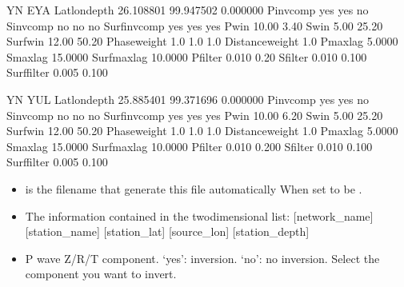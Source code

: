 \documentclass[a4paper,10pt,english,openany]{sphinxmanual}
\begin{document}
\begin{sphinxVerbatim}[commandchars=\\\{\},numbers=left,firstnumber=1,stepnumber=1]
YN   EYA   
Lat\PYGZus{}lon\PYGZus{}depth	26.108801   99.947502   0.000000   
P\PYGZus{}inv\PYGZus{}comp	yes	yes	no	
S\PYGZus{}inv\PYGZus{}comp	no	no	no	
Surf\PYGZus{}inv\PYGZus{}comp	yes	yes	yes	
P\PYGZus{}win		\PYGZhy{}10.00	3.40	
S\PYGZus{}win		\PYGZhy{}5.00	25.20	
Surf\PYGZus{}win		\PYGZhy{}12.00	50.20	
Phase\PYGZus{}weight	1.0	1.0	1.0	
Distance\PYGZus{}weight	1.0	
P\PYGZus{}maxlag		5.0000	
S\PYGZus{}maxlag		15.0000	
Surf\PYGZus{}maxlag	10.0000	
P\PYGZus{}filter		0.010	0.20	
S\PYGZus{}filter		0.010	0.100	
Surf\PYGZus{}filter	0.005	0.100	

YN   YUL   
Lat\PYGZus{}lon\PYGZus{}depth	25.885401   99.371696   0.000000   
P\PYGZus{}inv\PYGZus{}comp	yes	yes	no	
S\PYGZus{}inv\PYGZus{}comp	no	no	no	
Surf\PYGZus{}inv\PYGZus{}comp	yes	yes	yes	
P\PYGZus{}win		\PYGZhy{}10.00	6.20	
S\PYGZus{}win		\PYGZhy{}5.00	25.20	
Surf\PYGZus{}win		\PYGZhy{}12.00	50.20	
Phase\PYGZus{}weight	1.0	1.0	1.0	
Distance\PYGZus{}weight	1.0	
P\PYGZus{}maxlag		5.0000	
S\PYGZus{}maxlag		15.0000	
Surf\PYGZus{}maxlag	10.0000	
P\PYGZus{}filter		0.010	0.200	
S\PYGZus{}filter		0.010	0.100	
Surf\PYGZus{}filter	0.005	0.100	
\end{sphinxVerbatim}

\begin{itemize}
\item {} 
 is the filename that generate this file automatically When set 
to be .

\end{itemize}

\begin{itemize}
\item {} 
The information contained in the two\sphinxhyphen{}dimensional list: {[}network\_name{]} {[}station\_name{]}  {[}station\_lat{]}   {[}source\_lon{]}    {[}station\_depth{]}

\end{itemize}

\begin{itemize}
\item {} 
P wave Z/R/T component. ‘yes’: inversion. ‘no’: no inversion. Select the component you want to invert.

\end{itemize}
\end{document}
